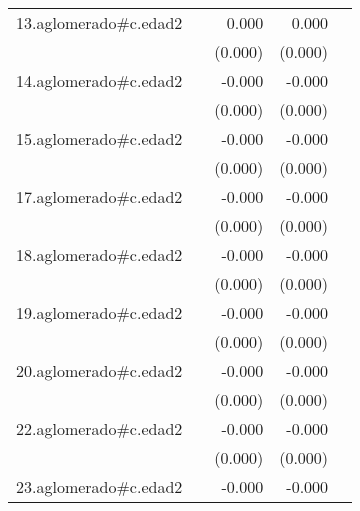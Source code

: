 {\begin{longtable}{l*{4}{D{.}{.}{-1}}}
\addlinespace
13.aglomerado#c.edad2&                     &       0.000         &       0.000         &                     \\
            &                     &     (0.000)         &     (0.000)         &                     \\
\addlinespace
14.aglomerado#c.edad2&                     &      -0.000         &      -0.000\sym{*}  &                     \\
            &                     &     (0.000)         &     (0.000)         &                     \\
\addlinespace
15.aglomerado#c.edad2&                     &      -0.000         &      -0.000         &                     \\
            &                     &     (0.000)         &     (0.000)         &                     \\
\addlinespace
17.aglomerado#c.edad2&                     &      -0.000         &      -0.000         &                     \\
            &                     &     (0.000)         &     (0.000)         &                     \\
\addlinespace
18.aglomerado#c.edad2&                     &      -0.000         &      -0.000         &                     \\
            &                     &     (0.000)         &     (0.000)         &                     \\
\addlinespace
19.aglomerado#c.edad2&                     &      -0.000         &      -0.000         &                     \\
            &                     &     (0.000)         &     (0.000)         &                     \\
\addlinespace
20.aglomerado#c.edad2&                     &      -0.000         &      -0.000         &                     \\
            &                     &     (0.000)         &     (0.000)         &                     \\
\addlinespace
22.aglomerado#c.edad2&                     &      -0.000         &      -0.000         &                     \\
            &                     &     (0.000)         &     (0.000)         &                     \\
\addlinespace
23.aglomerado#c.edad2&                     &      -0.000         &      -0.000         &                     \\

\end{longtable}}
